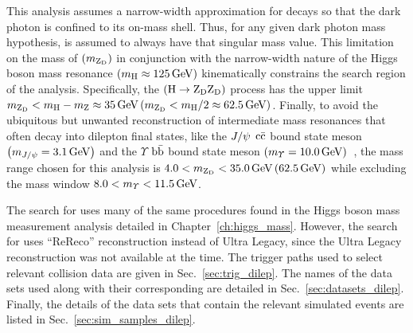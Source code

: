 
This analysis assumes a narrow-width approximation for \PZD decays so that the dark photon is confined to its on-mass shell.
Thus, for any given dark photon mass hypothesis, \PZD is assumed to always have that singular mass value.
This limitation on the mass of \PZD $\left(m_{\mathrm{Z}_\text{D}}\right)$ in conjunction with the narrow-width nature of the Higgs boson mass resonance $\left( m_{\mathrm{H}} \approx 125\,\text{Ge\hspace{-.08em}V} \right)$ kinematically constrains the search region of the analysis.
Specifically, the \htozzd $\left(\mathrm{H} \to \mathrm{Z}_\text{D} \mathrm{Z}_\text{D}\right)$ process has the upper limit
$m_{\mathrm{Z}_\text{D}} < m_{\mathrm{H}} - m_{\text{Z}} \approx 35\,\text{Ge\hspace{-.08em}V}    \left(m_{\mathrm{Z}_\text{D}} < m_{\mathrm{H}} / 2 \approx 62.5\,\text{Ge\hspace{-.08em}V}\right)$.
Finally, to avoid the ubiquitous but unwanted reconstruction of intermediate mass resonances that often decay into dilepton final states,
like the $J / \psi$ $\mathrm{c}\bar{\mathrm{c}}$ bound state meson $\left( m_{J / \psi} = 3.1\,\text{Ge\hspace{-.08em}V} \right)$ and the $\varUpsilon$ $\mathrm{b} \bar{\mathrm{b}}$ bound state meson $\left( m_{\varUpsilon} = 10.0\,\text{Ge\hspace{-.08em}V} \right)$~\cite{particle_data_group_review_2020},
the mass range chosen for this analysis is $4.0 < m_{\mathrm{Z}_\text{D}} < 35.0\,\text{Ge\hspace{-.08em}V} \left(62.5\,\text{Ge\hspace{-.08em}V}\right)$ while excluding the mass window $8.0 < m_{\varUpsilon} < 11.5\,\text{Ge\hspace{-.08em}V}$.

The search for \PZD uses many of the same procedures found in the Higgs boson mass measurement analysis detailed in Chapter~\ref{ch:higgs_mass}.
However, the search for \PZD uses ``ReReco'' reconstruction instead of Ultra Legacy, since the Ultra Legacy reconstruction was not available at the time.
The trigger paths used to select relevant \pp collision data are given in Sec.~\ref{sec:trig_dilep}.
The names of the data sets used along with their corresponding \lumiint are detailed in Sec.~\ref{sec:datasets_dilep}.
Finally, the details of the data sets that contain the relevant simulated events are listed in Sec.~\ref{sec:sim_samples_dilep}.


